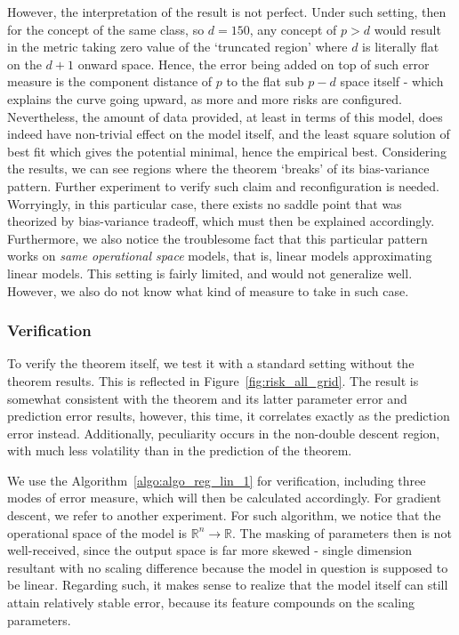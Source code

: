 \documentclass{article}
\begin{document}
However, the interpretation of the result is not perfect. Under such setting, then for the concept of the same class, so $d=150$, any concept of $p>d$ would result in the metric taking zero value of the `truncated region' where $d$ is literally flat on the $d+1$ onward space. Hence, the error being added on top of such error measure is the component distance of $p$ to the flat sub $p-d$ space itself - which explains the curve going upward, as more and more risks are configured. Nevertheless, the amount of data provided, at least in terms of this model, does indeed have non-trivial effect on the model itself, and the least square solution of best fit which gives the potential minimal, hence the empirical best. Considering the results, we can see regions where the theorem `breaks' of its bias-variance pattern. Further experiment to verify such claim and reconfiguration is needed. Worryingly, in this particular case, there exists no saddle point that was theorized by bias-variance tradeoff, which must then be explained accordingly. Furthermore, we also notice the troublesome fact that this particular pattern works on \textit{same operational space} models, that is, linear models approximating linear models. This setting is fairly limited, and would not generalize well. However, we also do not know what kind of measure to take in such case. 

\subsubsection{Verification}

To verify the theorem itself, we test it with a standard setting without the theorem results. This is reflected in Figure~\ref{fig:risk_all_grid}. The result is somewhat consistent with the theorem and its latter parameter error and prediction error results, however, this time, it correlates exactly as the prediction error instead. Additionally, peculiarity occurs in the non-double descent region, with much less volatility than in the prediction of the theorem. 

We use the Algorithm~\ref{algo:algo_reg_lin_1} for verification, including three modes of error measure, which will then be calculated accordingly. For gradient descent, we refer to another experiment. For such algorithm, we notice that the operational space of the model is $\mathbb{R}^{n}\to \mathbb{R}$. The masking of parameters then is not well-received, since the output space is far more skewed - single dimension resultant with no scaling difference because the model in question is supposed to be linear. Regarding such, it makes sense to realize that the model itself can still attain relatively stable error, because its feature compounds on the scaling parameters.  
\end{document}
